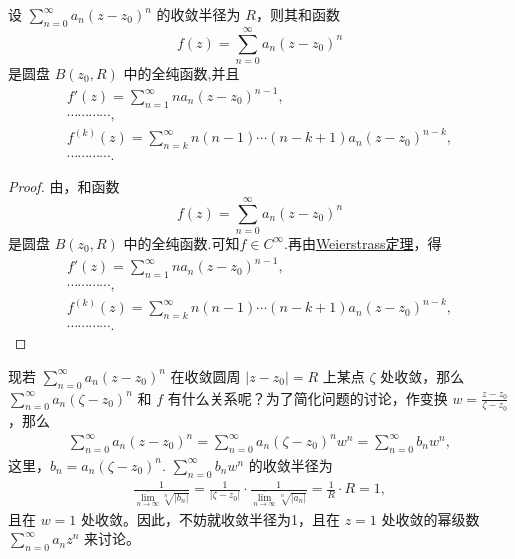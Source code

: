 \documentclass[../../main.tex]{subfiles}
\begin{document}
\begin{theorem}\label{theorem:幂级数在其收敛圆内确定一个全纯函数并且任意阶可导}
设 \( \sum_{n=0}^{\infty} a_n(z - z_0)^n \) 的收敛半径为 \( R \)，则其和函数
\[
f(z) = \sum_{n=0}^{\infty} a_n(z - z_0)^n
\]
是圆盘 \( B(z_0, R) \) 中的全纯函数,并且
\begin{gather*}
f'(z) = \sum_{n=1}^{\infty} n a_n(z - z_0)^{n - 1},
\\
\cdots\cdots\cdots\cdots,
\\
f^{(k)}(z) = \sum_{n=k}^{\infty} n(n - 1)\cdots(n - k + 1) a_n(z - z_0)^{n - k},
\\
\cdots\cdots\cdots\cdots.
\end{gather*}
\end{theorem}
\begin{proof}
由，和函数
\[
f(z) = \sum_{n=0}^{\infty} a_n(z - z_0)^n
\]
是圆盘 \( B(z_0, R) \) 中的全纯函数.可知$f\in C^{\infty}$.再由\hyperref[theorem:Weierstrass定理]{Weierstrass定理}，得
\begin{gather*}
f'(z) = \sum_{n=1}^{\infty} n a_n(z - z_0)^{n - 1},
\\
\cdots\cdots\cdots\cdots,
\\
f^{(k)}(z) = \sum_{n=k}^{\infty} n(n - 1)\cdots(n - k + 1) a_n(z - z_0)^{n - k},
\\
\cdots\cdots\cdots\cdots.
\end{gather*}

\end{proof}



现若 \( \sum_{n=0}^{\infty} a_n(z - z_0)^n \) 在收敛圆周 \( |z - z_0| = R \) 上某点 \( \zeta \) 处收敛，那么 \( \sum_{n=0}^{\infty} a_n(\zeta - z_0)^n \) 和 \( f \) 有什么关系呢？为了简化问题的讨论，作变换 \( w = \frac{z - z_0}{\zeta - z_0} \)，那么
\begin{align*}
\sum_{n=0}^{\infty} a_n(z - z_0)^n = \sum_{n=0}^{\infty} a_n(\zeta - z_0)^n w^n = \sum_{n=0}^{\infty} b_n w^n,
\end{align*}
这里，\( b_n = a_n(\zeta - z_0)^n \).$\,\,$\( \sum_{n=0}^{\infty} b_n w^n \) 的收敛半径为
\begin{align*}
\frac{1}{\underset{n\rightarrow \infty}{\overline{\lim }}\sqrt[n]{|b_n|}}=\frac{1}{|\zeta -z_0|}\cdot \frac{1}{\underset{n\rightarrow \infty}{\overline{\lim }}\sqrt[n]{|a_n|}}=\frac{1}{R}\cdot R=1,
\end{align*}
且在 \( w = 1 \) 处收敛。因此，不妨就收敛半径为1，且在 \( z = 1 \) 处收敛的幂级数 \( \sum_{n=0}^{\infty} a_n z^n \) 来讨论。
\end{document}
